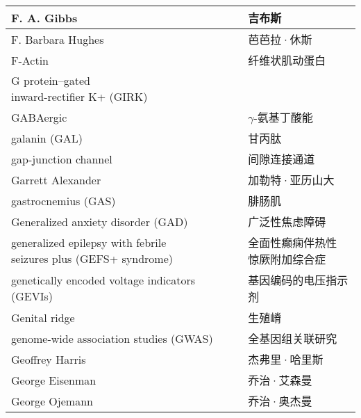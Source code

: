 \begin{longtable}{lll}
	\midrule
	F. A. Gibbs     &&  吉布斯  \\
	
	\midrule
	F. Barbara Hughes     &&  芭芭拉·休斯  \\
	
	\midrule
	F-Actin     &&  纤维状肌动蛋白  \\
	
	\midrule
	\makecell[l]{G protein–gated \\ inward-rectifier K+ (GIRK)}    &&  \makecell[l]{G蛋白门控的内向整流钾}  \\
	
	\midrule
	GABAergic    &&  $\gamma$-氨基丁酸能  \\
	
	\midrule
	galanin (GAL)   &&  甘丙肽  \\
	
	\midrule
	gap-junction channel    &&  间隙连接通道  \\
	
	\midrule
	Garrett Alexander    &&  加勒特·亚历山大  \\
	
	\midrule
	gastrocnemius (GAS)    &&  腓肠肌  \\
	
	\midrule
	Generalized anxiety disorder (GAD)     &&  广泛性焦虑障碍  \\
	
	\midrule
	\makecell[l]{generalized epilepsy with febrile \\ seizures plus (GEFS+ syndrome)}     &&  \makecell[l]{全面性癫痫伴热性\\惊厥附加综合症}  \\
	
	\midrule
	genetically encoded voltage indicators (GEVIs)   &&  基因编码的电压指示剂  \\
	
	\midrule
	Genital ridge     &&  生殖嵴  \\
	
	\midrule
	genome-wide association studies (GWAS)     &&  全基因组关联研究  \\
	
	\midrule
	Geoffrey Harris     &&  杰弗里·哈里斯  \\
	
	\midrule
	George Eisenman     &&  乔治·艾森曼  \\
	
	\midrule
	George Ojemann     &&  乔治·奥杰曼  \\
	

\end{longtable}
